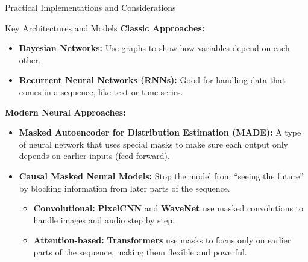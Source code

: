 \begin{frame}[allowframebreaks]{}
    \centering
    \LARGE Practical Implementations and Considerations
\end{frame}

\begin{frame}[allowframebreaks]{Key Architectures and Models}
    \textbf{\large Classic Approaches:}
    \begin{itemize}
        \item \textbf{Bayesian Networks:} Use graphs to show how variables depend on each other.
        \item \textbf{Recurrent Neural Networks (RNNs):} Good for handling data that comes in a sequence, like text or time series.
    \end{itemize}

    \framebreak

    \textbf{\large Modern Neural Approaches:}
    \begin{itemize}
        \item \textbf{Masked Autoencoder for Distribution Estimation (MADE):} A type of neural network that uses special masks to make sure each output only depends on earlier inputs (feed-forward).
        \item \textbf{Causal Masked Neural Models:} Stop the model from ``seeing the future'' by blocking information from later parts of the sequence.
        \begin{itemize}
            \item \textbf{Convolutional:} \textbf{PixelCNN} and \textbf{WaveNet} use masked convolutions to handle images and audio step by step.
            \item \textbf{Attention-based:} \textbf{Transformers} use masks to focus only on earlier parts of the sequence, making them flexible and powerful.
        \end{itemize}
    \end{itemize}
\end{frame}

